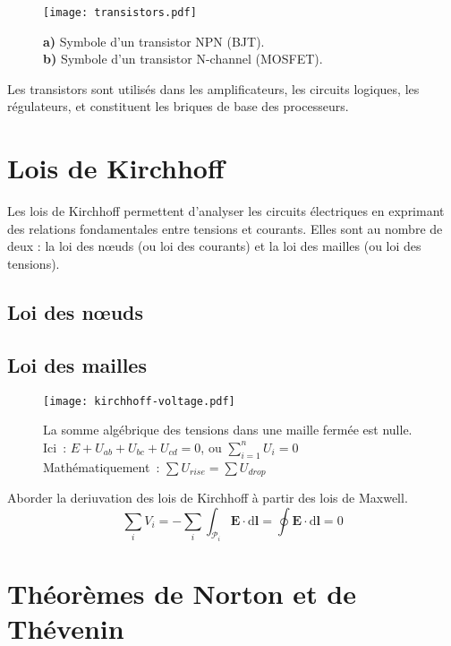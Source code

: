 \begin{figure}[H]
    \centering
    \texttt{[image: transistors.pdf]}
    \caption{\centering\newline
        \textbf{a)} Symbole d’un transistor NPN (BJT).\\
        \textbf{b)} Symbole d’un transistor N-channel (MOSFET).
    }
\end{figure}

Les transistors sont utilisés dans les amplificateurs,
les circuits logiques, les régulateurs, et constituent les briques de base des processeurs.

\section{Lois de Kirchhoff} \label{subsec:kirchhoff}
Les lois de Kirchhoff permettent d’analyser les circuits électriques en exprimant
des relations fondamentales entre tensions et courants. Elles sont au nombre de deux :
la loi des nœuds (ou loi des courants) et la loi des mailles (ou loi des tensions).
\subsection{Loi des n{\oe}uds} \label{subsec:noeuds}
\begin{figure}[H]
    \centering
\end{figure}

\subsection{Loi des mailles} \label{subsec:mailles}
\begin{figure}[H]
    \centering
    \texttt{[image: kirchhoff-voltage.pdf]}
    \caption[Loi des mailles.]{
        La somme algébrique des tensions dans une maille fermée est nulle.\\
        Ici~: \(E+U_{ab}+U_{bc}+U_{cd}=0\), ou \(\displaystyle\sum_{i=1}^nU_i=0\)\\
        \vspace{\baselineskip}
        Mathématiquement~: \(\displaystyle\sum U_{rise} = \displaystyle\sum U_{drop}\)
    }
\end{figure}
\begin{Todo}
	Aborder la deriuvation des lois de Kirchhoff \`a partir des lois de Maxwell.
	\[\sum_i V_i = - \sum_i \int_{\mathcal{P}_i}\mathbf{E}\cdot\mathrm{d}\mathbf{l} = \oint\mathbf{E}\cdot\mathrm{d}\mathbf{l} = 0\]
\end{Todo}

\section{Théorèmes de Norton et de Thévenin} \label{subsec:norton_thevenin}
